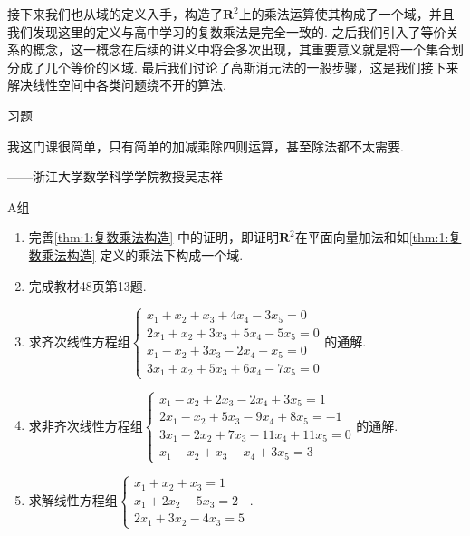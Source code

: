 接下来我们也从域的定义入手，构造了$\mathbf{R}^2$上的乘法运算使其构成了一个域，并且我们发现这里的定义与高中学习的复数乘法是完全一致的. 之后我们引入了等价关系的概念，这一概念在后续的讲义中将会多次出现，其重要意义就是将一个集合划分成了几个等价的区域. 最后我们讨论了高斯消元法的一般步骤，这是我们接下来解决线性空间中各类问题绕不开的算法.

\vspace{2ex}
\centerline{\heiti \Large 习题}

\vspace{2ex}
{\kaishu 我这门课很简单，只有简单的加减乘除四则运算，甚至除法都不太需要.}
\begin{flushright}
    \kaishu
    ——浙江大学数学科学学院教授吴志祥
\end{flushright}

\centerline{\heiti A组}
\begin{enumerate}
    \item 完善\autoref{thm:1:复数乘法构造} 中的证明，即证明$\mathbf{R}^2$在平面向量加法和如\autoref*{thm:1:复数乘法构造} 定义的乘法下构成一个域.

    \item 完成教材48页第13题.

    \item 求齐次线性方程组$\begin{cases}
                  x_1+x_2+x_3+4x_4-3x_5=0   \\
                  2x_1+x_2+3x_3+5x_4-5x_5=0 \\
                  x_1-x_2+3x_3-2x_4-x_5=0   \\
                  3x_1+x_2+5x_3+6x_4-7x_5=0
              \end{cases}$的通解.

    \item 求非齐次线性方程组$\begin{cases}
                  x_1-x_2+2x_3-2x_4+3x_5=1     \\
                  2x_1-x_2+5x_3-9x_4+8x_5=-1   \\
                  3x_1-2x_2+7x_3-11x_4+11x_5=0 \\
                  x_1-x_2+x_3-x_4+3x_5=3
              \end{cases}$的通解.

    \item 求解线性方程组$\begin{cases}
                  x_1+x_2+x_3=1   \\
                  x_1+2x_2-5x_3=2 \\
                  2x_1+3x_2-4x_3=5
              \end{cases}$.
\end{enumerate}

